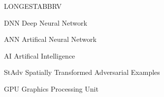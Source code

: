 \begin{theglossary}{LONGESTABBRV}

    \item[DNN] Deep Neural Network
    \item[ANN] Artifical Neural Network
    \item[AI] Artifical Intelligence
    \item[StAdv] Spatially Transformed Adversarial Examples
    \item[GPU] Graphics Processing Unit


\end{theglossary}
